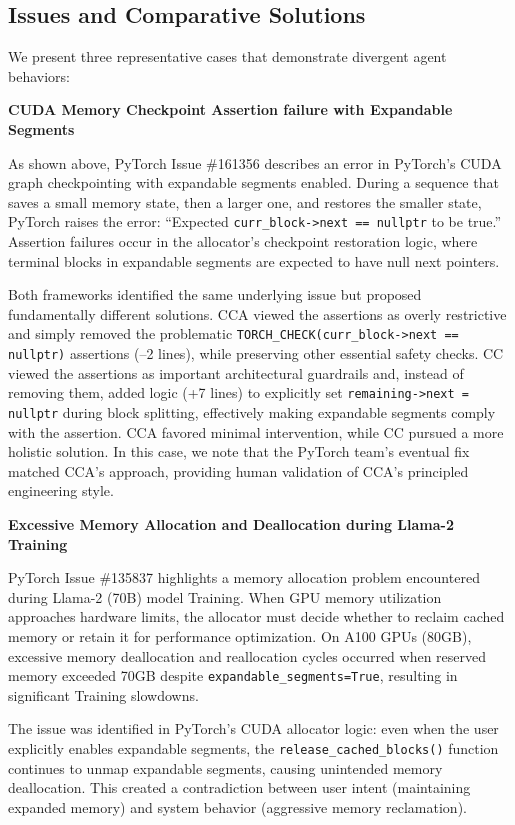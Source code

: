 \subsection{Issues and Comparative Solutions}

We present three representative cases that demonstrate divergent agent behaviors:

\textbf{CUDA Memory Checkpoint Assertion failure with Expandable Segments}

As shown above, PyTorch Issue \#161356 describes an error in PyTorch's CUDA graph checkpointing with expandable segments enabled. During a sequence that saves a small memory state, then a larger one, and restores the smaller state, PyTorch raises the error: ``Expected \small{\texttt{curr\_block->next == nullptr}} \normalsize to be true.'' Assertion failures occur in the allocator's checkpoint restoration logic, where terminal blocks in expandable segments are expected to have null next pointers.

Both frameworks identified the same underlying issue but proposed fundamentally different solutions. CCA viewed the assertions as overly restrictive and simply removed the problematic \small{\texttt{TORCH\_CHECK(curr\_block->next == nullptr)}} \normalsize assertions (--2 lines), while preserving other essential safety checks. CC viewed the assertions as important architectural guardrails and, instead of removing them, added logic (+7 lines) to explicitly set \small{\texttt{remaining->next = nullptr}} \normalsize during block splitting, effectively making expandable segments comply with the assertion. CCA favored minimal intervention, while CC pursued a more holistic solution. In this case, we note that the PyTorch team's eventual fix matched CCA's approach, providing human validation of CCA's principled engineering style.

\textbf{Excessive Memory Allocation and Deallocation during Llama-2 Training}

PyTorch Issue \#135837 highlights a memory allocation problem encountered during Llama-2 (70B) model Training. When GPU memory utilization approaches hardware limits, the allocator must decide whether to reclaim cached memory or retain it for performance optimization. On A100 GPUs (80GB), excessive memory deallocation and reallocation cycles occurred when reserved memory exceeded 70GB despite \small{\texttt{expandable\_segments=True}}, \normalsize resulting in significant Training slowdowns.

The issue was identified in PyTorch's CUDA allocator logic: even when the user explicitly enables expandable segments, the \small{\texttt{release\_cached\_blocks()}} \normalsize function continues to unmap expandable segments, causing unintended memory deallocation. This created a contradiction between user intent (maintaining expanded memory) and system behavior (aggressive memory reclamation). 

